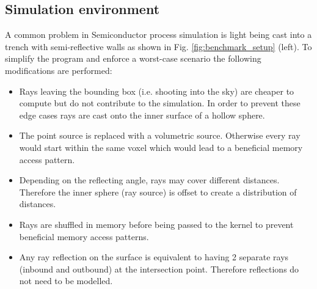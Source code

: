 \subsection{Simulation environment}

A common problem in Semiconductor process simulation is light being cast into a trench with semi-reflective walls as shown in Fig. \ref{fig:benchmark_setup} (left).
To simplify the program and enforce a worst-case scenario the following modifications are performed:

\begin{itemize}
	\item Rays leaving the bounding box (i.e. shooting into the sky) are cheaper to compute but do not contribute to the simulation.
	      In order to prevent these edge cases rays are cast onto the inner surface of a hollow sphere.
	\item The point source is replaced with a volumetric source. Otherwise every ray would start within the same voxel which would lead to a beneficial memory access pattern.
	\item Depending on the reflecting angle, rays may cover different distances. Therefore the inner sphere (ray source) is offset to create a distribution of distances.
	\item Rays are shuffled in memory before being passed to the kernel to prevent beneficial memory access patterns.
	\item Any ray reflection on the surface is equivalent to having 2 separate rays (inbound and outbound) at the intersection point. Therefore reflections do not need to be modelled.
\end{itemize}


